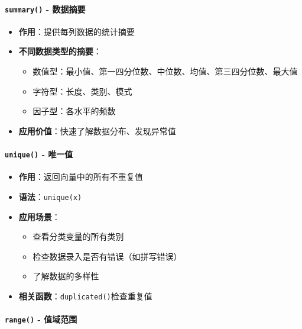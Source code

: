 \documentclass[
]{book}
\providecommand{\tightlist}{%
  \setlength{\itemsep}{0pt}\setlength{\parskip}{0pt}}
\begin{document}
\hypertarget{summary---ux6570ux636eux6458ux8981}{%
\paragraph{\texorpdfstring{\texttt{summary()} - 数据摘要}{summary() - 数据摘要}}\label{summary---ux6570ux636eux6458ux8981}}

\begin{itemize}
\tightlist
\item
  \textbf{作用}：提供每列数据的统计摘要
\item
  \textbf{不同数据类型的摘要}：

  \begin{itemize}
  \tightlist
  \item
    数值型：最小值、第一四分位数、中位数、均值、第三四分位数、最大值
  \item
    字符型：长度、类别、模式
  \item
    因子型：各水平的频数
  \end{itemize}
\item
  \textbf{应用价值}：快速了解数据分布、发现异常值
\end{itemize}

\hypertarget{unique---ux552fux4e00ux503c}{%
\paragraph{\texorpdfstring{\texttt{unique()} - 唯一值}{unique() - 唯一值}}\label{unique---ux552fux4e00ux503c}}

\begin{itemize}
\tightlist
\item
  \textbf{作用}：返回向量中的所有不重复值
\item
  \textbf{语法}：\texttt{unique(x)}
\item
  \textbf{应用场景}：

  \begin{itemize}
  \tightlist
  \item
    查看分类变量的所有类别
  \item
    检查数据录入是否有错误（如拼写错误）
  \item
    了解数据的多样性
  \end{itemize}
\item
  \textbf{相关函数}：\texttt{duplicated()}检查重复值
\end{itemize}

\hypertarget{range---ux503cux57dfux8303ux56f4}{%
\paragraph{\texorpdfstring{\texttt{range()} - 值域范围}{range() - 值域范围}}\label{range---ux503cux57dfux8303ux56f4}}
\end{document}
